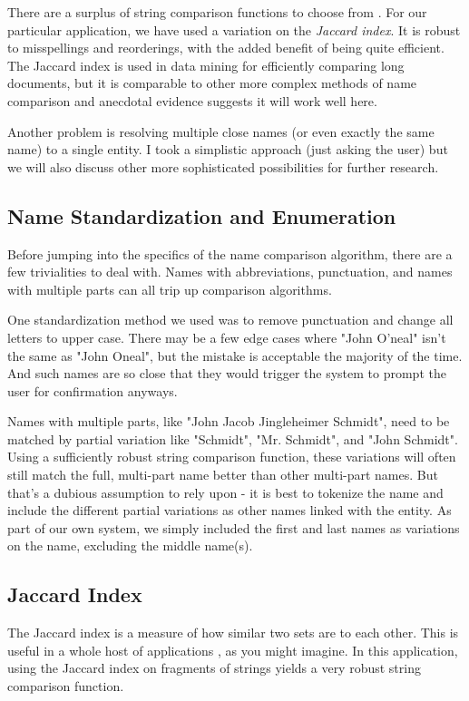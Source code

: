 \documentclass[11pt]{article}
\begin{document}
There are a surplus of string comparison functions to choose from \cite{comparison}.
For our particular application, we have used a variation on the {\em Jaccard index}.
It is robust to misspellings and reorderings, with the added benefit of being quite efficient.
The Jaccard index is used in data mining for efficiently comparing long documents,
but it is comparable to other more complex methods of name comparison \cite{comparison} and 
anecdotal evidence suggests it will work well here.

Another problem is resolving multiple close names (or even exactly the same name) to a single entity.
I took a simplistic approach (just asking the user) but we will also discuss other more
sophisticated possibilities for further research. 

\subsection{Name Standardization and Enumeration}
Before jumping into the specifics of the name comparison algorithm, there are a few trivialities
to deal with. Names with abbreviations, punctuation, and names with multiple parts can all
trip up comparison algorithms.

One standardization method we used was to remove punctuation and change all letters to upper case.
There may be a few edge cases where "John O'neal" isn't the same as "John Oneal",
but the mistake is acceptable the majority of the time. And such names are so close that they would
trigger the system to prompt the user for confirmation anyways.

Names with multiple parts, like "John Jacob Jingleheimer Schmidt", need to be matched by
partial variation like "Schmidt", "Mr. Schmidt", and "John Schmidt". 
Using a sufficiently robust string comparison function, these variations will often 
still match the full, multi-part name better than other multi-part names.
But that's a dubious assumption to rely upon - it is best to tokenize the name and
include the different partial variations as other names linked with the entity.
As part of our own system, we simply included the first and last names as variations on
the name, excluding the middle name(s).

\subsection{Jaccard Index}
The Jaccard index is a measure of how similar two sets are to each other.
This is useful in a whole host of applications \cite{general}, as you might imagine. 
In this application, using the Jaccard index on fragments of strings yields a very
robust string comparison function.
\end{document}
